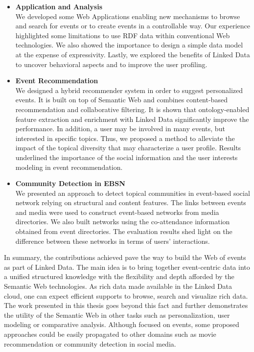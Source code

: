 \begin{itemize}
\item \textbf{Application and Analysis}
\vspace{2mm}  
\\ We developed some Web Applications enabling new mechanisms to browse and search for events or to create events in a controllable way. Our experience highlighted some limitations to use RDF data within conventional Web technologies. We also showed the importance to design a simple data model  at the expense of expressivity. Lastly, we explored the benefits of Linked Data to uncover behavioral aspects and to improve the user profiling. 

\item \textbf{Event Recommendation}
\vspace{2mm}  
\\We designed a hybrid recommender system in order to suggest personalized events. It is built on top of Semantic Web and combines content-based recommendation and collaborative filtering. It is shown that ontology-enabled feature extraction and enrichment with Linked Data significantly improve the performance. In addition, a user may be involved in many events, but interested in specific topics. Thus, we proposed a method to alleviate the impact of the topical diversity that may characterize a user profile. Results underlined the importance of the social information and the user interests modeling in event recommendation.
\item \textbf{Community Detection in EBSN}
\vspace{2mm}  
\\We presented an approach to detect topical communities in event-based social network relying on structural and content features. The links between events and media were used to construct event-based networks from media directories. We also built networks using the co-attendance information obtained from event directories. The evaluation results shed light on the difference between these networks in terms of users' interactions.
\end{itemize}

In summary, the contributions achieved pave the way to build the Web of events as part of Linked Data. The main idea is to bring together event-centric data into a unified structured knowledge with the flexibility and depth afforded by the Semantic Web technologies. As rich data made available in the Linked Data cloud, one can expect efficient supports to browse, search and visualize rich data. The work presented in this thesis goes beyond this fact and further demonstrates the utility of the Semantic Web in other tasks such as personalization, user modeling or comparative analysis. Although focused on events, some proposed approaches could be easily propagated to other domains such as movie recommendation or community detection in social media.

